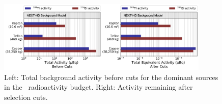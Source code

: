 \begin{figure}[tb]
\centering
\includegraphics[width=0.90\textwidth]{img2/RadioactiveBudget2.jpg}
\caption{Left: Total background activity before cuts for the dominant sources in the \NHD\ radioactivity budget. Right: Activity remaining after selection cuts.}
\label{fig:ActivityComp}
\end{figure}




